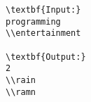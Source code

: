\begin{verbatim}
\textbf{Input:}
programming
\\entertainment

\textbf{Output:}
2
\\rain
\\ramn \end{verbatim}